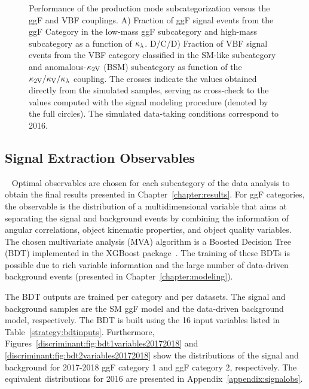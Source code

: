 \begin{figure}[ht!]
\begin{center}
\end{center}
\caption[Performance of the production mode subcategorization as function of the ggF and VBF couplings]{Performance of the production mode subcategorization versus the ggF and VBF couplings. A) Fraction of ggF signal events from the ggF Category in the low-mass ggF subcategory and high-mass subcategory as a function of $\kappa_{\lambda}$. D/C/D) Fraction of VBF signal events from the VBF category classified in the SM-like subcategory and anomalous-$\mathrm{\kappa_{2V} }$ (BSM) subcategory as function of the $\mathrm{\kappa_{2V} }/\mathrm{\kappa_{V} }/\kappa_{\lambda}$ coupling. The crosses indicate the values obtained directly from the simulated samples, serving as cross-check to the values computed with the signal modeling procedure (denoted by the full circles). The simulated data-taking conditions correspond to 2016.}
\label{fig:eff_2016_subcategorization}
\end{figure}

\clearpage
\subsection{Signal Extraction Observables}~\label{subsec:ggfvbfobservales}
Optimal observables are chosen for each subcategory of the data analysis to obtain the final results presented in Chapter~\ref{chapter:results}. For ggF categories, the observable is the distribution of a multidimensional variable that aims at separating the signal and background events by combining the information of angular correlations, object kinematic properties, and object quality variables. The chosen multivariate analysis (MVA) algorithm is a Boosted Decision Tree (BDT) implemented in the XGBoost package~\cite{xgboost}. The training of these BDTs is possible due to rich variable information and the large number of data-driven background events (presented in Chapter~\ref{chapter:modeling}). 

The BDT outputs are trained per category and per datasets. The signal and background samples are the SM ggF model and the data-driven background model, respectively. The BDT is built using the  16 input variables listed in Table~\ref{strategy:bdtinputs}. Furthermore, Figures~\ref{discriminant:fig:bdt1variables20172018} and \ref{discriminant:fig:bdt2variables20172018} show the distributions of the signal and background for 2017-2018 ggF category 1 and ggF category 2, respectively. The equivalent distributions for 2016 are presented in Appendix~\ref{appendix:signalobs}.

